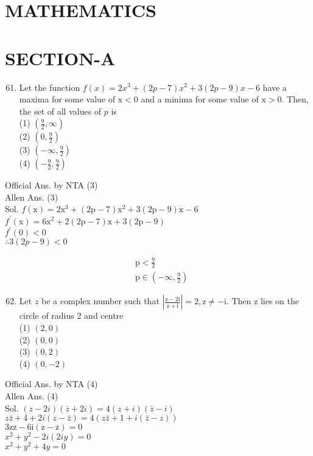 \documentclass[10pt]{article}
\begin{document}
\section*{MATHEMATICS}
\section*{SECTION-A}
\begin{enumerate}
  \setcounter{enumi}{60}
  \item Let the function \(f(x)=2 x^{3}+(2 p-7) x^{2}+3(2 p-9) x-6\) have a maxima for some value of \(\mathrm{x}<0\) and a minima for some value of \(\mathrm{x}>0\). Then, the set of all values of \(p\) is\\
(1) \(\left(\frac{9}{2}, \infty\right)\)\\
(2) \(\left(0, \frac{9}{2}\right)\)\\
(3) \(\left(-\infty, \frac{9}{2}\right)\)\\
(4) \(\left(-\frac{9}{2}, \frac{9}{2}\right)\)
\end{enumerate}

Official Ans. by NTA (3)\\
Allen Ans. (3)\\
Sol. \(f(\mathrm{x})=2 \mathrm{x}^{3}+(2 \mathrm{p}-7) \mathrm{x}^{2}+3(2 \mathrm{p}-9) \mathrm{x}-6\)\\
\(f^{\prime}(\mathrm{x})=6 \mathrm{x}^{2}+2(2 \mathrm{p}-7) \mathrm{x}+3(2 \mathrm{p}-9)\)\\
\(f^{\prime}(0)<0\)\\
\(\therefore 3(2 p-9)<0\)

\[
\begin{aligned}
& \mathrm{p}<\frac{9}{2} \\
& \mathrm{p} \in\left(-\infty, \frac{9}{2}\right)
\end{aligned}
\]

\begin{enumerate}
  \setcounter{enumi}{61}
  \item Let \(z\) be a complex number such that \(\left|\frac{\mathrm{z}-2 \mathrm{i}}{\mathrm{z}+\mathrm{i}}\right|=2, \mathrm{z} \neq-\mathrm{i}\). Then z lies on the circle of radius 2 and centre\\
(1) \((2,0)\)\\
(2) \((0,0)\)\\
(3) \((0,2)\)\\
(4) \((0,-2)\)
\end{enumerate}

Official Ans. by NTA (4)\\
Allen Ans. (4)\\
Sol. \((z-2 i)(\bar{z}+2 i)=4(z+i)(\bar{z}-i)\)\\
\(z \bar{z}+4+2 i(z-\bar{z})=4(z \bar{z}+1+i(\bar{z}-z))\)\\
\(3 \mathrm{z} \overline{\mathrm{z}}-6 \mathrm{i}(\mathrm{z}-\overline{\mathrm{z}})=0\)\\
\(x^{2}+y^{2}-2 i(2 i y)=0\)\\
\(x^{2}+y^{2}+4 y=0\)
\end{document}
